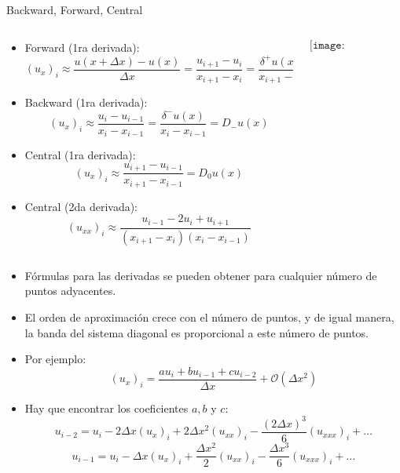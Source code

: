 \documentclass[handout]{beamer}
\begin{document}
\begin{frame}{Backward, Forward, Central}

\begin{columns}
\begin{column}{0.52\textwidth}
\begin{footnotesize}
  \begin{itemize}[<+->]
  \item Forward (1ra derivada):
    \[
    (u_x)_i \approx \frac{u(x+\Delta x)-u(x)}{\Delta x} = \frac{u_{i+1}-u_{i}}{x_{i+1}-x_{i}} = \frac{\delta^{+} u(x)}{x_{i+1}-x_{i}} = D_+u(x)
    \]
  \item Backward (1ra derivada):
    \[
    (u_x)_i \approx \frac{u_{i}-u_{i-1}}{x_{i}-x_{i-1}} = \frac{\delta^{-} u(x)}{x_{i}-x_{i-1}} = D_-u(x)
    \]
  \item Central (1ra derivada):
    \[
    (u_x)_i \approx \frac{u_{i+1}-u_{i-1}}{x_{i+1}-x_{i-1}} = D_0u(x)
    \]
  \item Central (2da derivada):
    \[
    (u_{xx})_i \approx \frac{u_{i-1} - 2u_i + u_{i+1}}{(x_{i+1}-x_{i})(x_{i}-x_{i-1})}
     \]
  \end{itemize}
\end{footnotesize}
\end{column}
\begin{column}{0.48\textwidth}
\vspace{2cm}
$$\texttt{[image: PendientesFDM]}$$
\end{column}
\end{columns}

\end{frame}


\begin{frame}
  \begin{itemize}[<+->]
  \item F\'ormulas para las derivadas se pueden obtener para cualquier n\'umero de puntos
    adyacentes.
  \item El orden de aproximaci\'on crece con el n\'umero de puntos, y de igual manera,  
    la banda del sistema diagonal es proporcional a este n\'umero de puntos.
  \item Por ejemplo:
    \[
    (u_x)_i=\frac{au_i + bu_{i-1}+cu_{i-2}}{\Delta x} + \mathcal{O}(\Delta x^2)
    \]
  \item Hay que encontrar los coeficientes $a,b$ y $c$:
{\small{
    \[
    u_{i-2}=u_i - 2\Delta x (u_x)_i + 2\Delta x^2 (u_{xx})_i - 
    \frac{(2\Delta x)^3}{6} (u_{xxx})_i + \dots 
    \]
    \[
    u_{i-1}=u_i - \Delta x (u_x)_i + \frac{\Delta x^2}{2} (u_{xx})_i - 
    \frac{\Delta x^3}{6} (u_{xxx})_i + \dots 
    \]
}}
  \end{itemize}
\end{frame}
\end{document}
